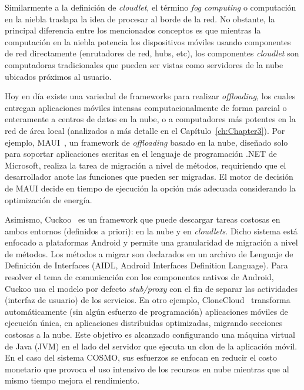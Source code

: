 
Similarmente a la definición de \emph{cloudlet}, el término \emph{fog computing} o computación en la niebla 
\cite{Bonomi:2012:FCR:2342509.2342513} traslapa la idea de procesar al borde de la red. No obstante, la principal diferencia entre 
los mencionados conceptos es que mientras la computación en la niebla potencia los dispositivos móviles usando componentes de red 
directamente (enrutadores 
de red, hubs, etc), los componentes \emph{cloudlet} son computadoras tradicionales que pueden ser vistas como servidores de la nube 
ubicados próximos al usuario. 

Hoy en día existe una variedad de frameworks para realizar \emph{offloading}, los cuales entregan aplicaciones móviles intensas
computacionalmente de forma parcial o enteramente a centros de datos en la nube, o a computadores más potentes en la red de área local
(analizados a más detalle en el Capítulo~\ref{ch:Chapter3}). Por ejemplo, MAUI~\cite{Cuervo:2010:MMS:1814433.1814441}, un framework de 
\emph{offloading} basado en la nube, diseñado solo para soportar aplicaciones escritas en el lenguaje de programación .NET de Microsoft, realiza la tarea de 
migración a nivel de métodos, requiriendo que el desarrollador anote las funciones que pueden ser migradas. El motor de decisión de MAUI 
decide en tiempo de ejecución la opción más adecuada considerando la optimización de energía.

Asimismo, Cuckoo~\cite{kemp2012cuckoo} es un framework que puede descargar tareas costosas en ambos entornos (definidos a priori): en la nube y en 
\emph{cloudlets}. Dicho sistema está enfocado a plataformas Android y permite una granularidad de migración a nivel de métodos.
Los métodos a migrar son declarados en un archivo de Lenguaje de Definición de Interfaces (AIDL, Android Interfaces Definition Language). 
Para resolver el tema de comunicación con los componentes nativos de Android, Cuckoo usa el modelo por defecto \textit{stub/proxy} con 
el fin de separar las actividades (interfaz de usuario) de los servicios. En otro ejemplo, CloneCloud~\cite{chun2011clonecloud} transforma 
automáticamente (sin algún esfuerzo de programación) aplicaciones móviles de ejecución única, en aplicaciones distribuidas optimizadas, 
migrando secciones costosas a la nube. Este objetivo es alcanzado configurando una máquina virtual de Java (JVM) en el lado del servidor que 
ejecuta un clon de la aplicación móvil. En el caso del sistema COSMO, sus esfuerzos se enfocan en reducir el costo monetario que provoca 
el uso intensivo de los recursos en nube mientras que al mismo tiempo mejora el rendimiento. 

